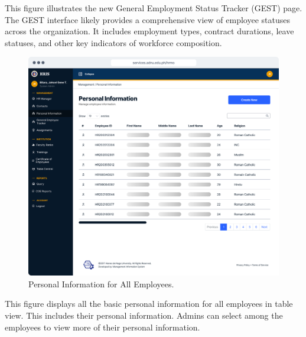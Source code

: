    This figure illustrates the new General Employment Status Tracker (GEST) page. The GEST interface likely provides a comprehensive view of employee statuses across the organization. It includes employment types, contract durations, leave statuses, and other key indicators of workforce composition. 

    \begin{figure}[H]
        \centering
        \includegraphics[width=1\linewidth]{figures/app/pi.png}
        \caption{Personal Information for All Employees.}
        \label{fig:app-pi}
    \end{figure}

    This figure displays all the basic personal information for all employees in table view. This includes their personal information. Admins can select among the employees to view more of their personal information.

